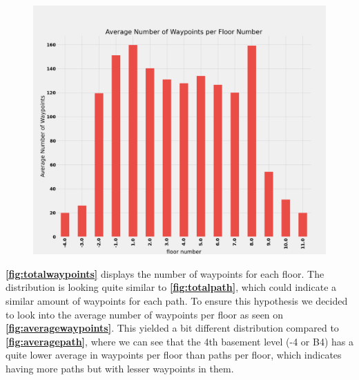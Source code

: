 \begin{figure}[ht]
\begin{minipage}{.45\textwidth}
    \includegraphics[width=.9\textwidth]{Images/ProblemAnalysis/datadistribution5.png}
    \label{fig:averagewaypoints}
    \end{minipage}
\end{figure}


\textbf{\autoref{fig:totalwaypoints}} displays the number of waypoints for each floor. The distribution is looking quite similar to \textbf{\autoref{fig:totalpath}}, which could indicate a similar amount of waypoints for each path. To ensure this hypothesis we decided to look into the average number of waypoints per floor as seen on \textbf{\autoref{fig:averagewaypoints}}. This yielded a bit different distribution compared to \textbf{\autoref{fig:averagepath}}, where we can see that the 4th basement level (-4 or B4) has a quite lower average in waypoints per floor than paths per floor, which indicates having more paths but with lesser waypoints in them.

